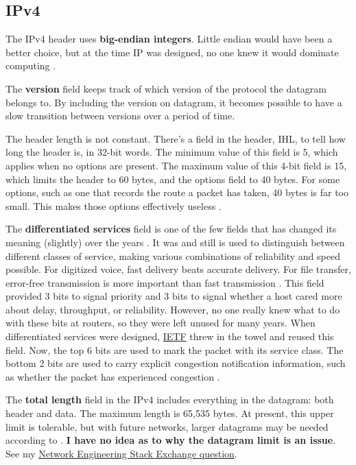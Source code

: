 \subsection{IPv4}

The IPv4 header uses \textbf{big-endian integers}. Little endian would have been a better choice, but at the time IP was designed, no one knew it would dominate computing \cite{computer-networks-tanenbaum-2012}.

The \textbf{version} field keeps track of which version of the protocol the datagram belongs to. By including the version on datagram, it becomes possible to have a slow transition between versions over a period of time.

The header length is not constant. There's a field in the header, IHL, to tell how long the header is, in 32-bit words. The minimum value of this field is 5, which applies when no options are present.
The maximum value of this 4-bit field is 15, which limits the header to 60 bytes, and the options field to 40 bytes. For some options, such as one that records the route a packet has taken, 40 bytes is far too small.
This makes those options effectively useless \cite{computer-networks-tanenbaum-2012}.

The \textbf{differentiated services} field is one of the few fields that has changed its meaning (slightly) over the years \cite{computer-networks-tanenbaum-2012}.
It was and still is used to distinguish between different classes of service, making various combinations of reliability and speed possible.
For digitized voice, fast delivery beats accurate delivery.
For file transfer, error-free transmission is more important than fast transmission \cite{computer-networks-tanenbaum-2012}.
This field provided 3 bits to signal priority and 3 bits to signal whether a host cared more about delay, throughput, or reliability.
However, no one really knew what to do with these bits at routers, so they were left unused for many years.
When differentiated services were designed, \href{https://en.wikipedia.org/wiki/Internet_Engineering_Task_Force}{IETF} threw in the towel and reused this field.
Now, the top 6 bits are used to mark the packet with its service class.
The bottom 2 bits are used to carry explicit congestion notification information, such as whether the packet has experienced congestion \cite{computer-networks-tanenbaum-2012}.

The \textbf{total length} field in the IPv4 includes everything in the datagram: both header and data.
The maximum length is 65,535 bytes. At present, this upper limit is tolerable, but with future networks, larger datagrams may be needed according to \cite{computer-networks-tanenbaum-2012}.
\textbf{I have no idea as to why the datagram limit is an issue}.
See my \href{https://networkengineering.stackexchange.com/questions/54480/why-is-the-ip-datagram-total-length-an-issue}{Network Engineering Stack Exchange question}.

